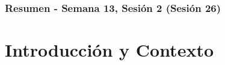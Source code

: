 \documentclass[10pt]{beamer}
\begin{document}
\myfront{}

\begin{frame}
  \titlepage
\end{frame}

\begin{frame}
  \frametitle{Resumen - Semana 13, Sesión 2 (Sesión 26)}
  \tableofcontents
\end{frame}


\section{Introducción y Contexto}
\end{document}
